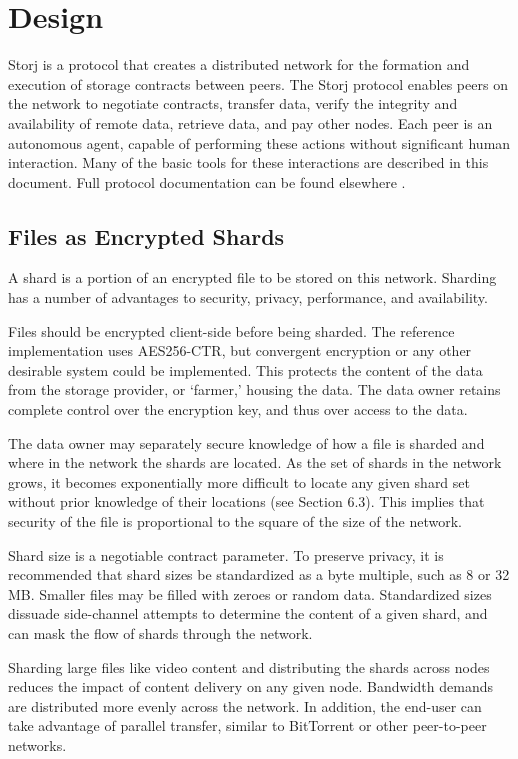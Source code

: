\documentclass[a4paper,10pt]{article}
\begin{document}
\section{Design}
Storj is a protocol that creates a distributed network for the formation and
execution of storage contracts between peers. The Storj protocol enables peers
on the network to negotiate contracts, transfer data, verify the integrity and
availability of remote data, retrieve data, and pay other nodes. Each peer is an
autonomous agent, capable of performing these actions without significant human
interaction. Many of the basic tools for these interactions are described in
this document. Full protocol documentation can be found elsewhere \cite{1}.

\subsection{Files as Encrypted Shards}
A shard is a portion of an encrypted file to be stored on this network. Sharding
has a number of advantages to security, privacy, performance, and availability.

Files should be encrypted client-side before being sharded. The reference
implementation uses AES256-CTR, but convergent encryption or any other desirable
system could be implemented. This protects the content of the data from the
storage provider, or ‘farmer,’ housing the data. The data owner retains complete
control over the encryption key, and thus over access to the data.

The data owner may separately secure knowledge of how a file is sharded and
where in the network the shards are located. As the set of shards in the network
grows, it becomes exponentially more difficult to locate any given shard set
without prior knowledge of their locations (see Section 6.3). This implies that
security of the file is proportional to the square of the size of the network.

Shard size is a negotiable contract parameter. To preserve privacy, it is
recommended that shard sizes be standardized as a byte multiple, such as 8 or 32
MB. Smaller files may be filled with zeroes or random data. Standardized sizes
dissuade side-channel attempts to determine the content of a given shard, and
can mask the flow of shards through the network.

Sharding large files like video content and distributing the shards across nodes
reduces the impact of content delivery on any given node. Bandwidth demands are
distributed more evenly across the network. In addition, the end-user can take
advantage of parallel transfer, similar to BitTorrent \cite{24} or other
peer-to-peer networks.
\end{document}
